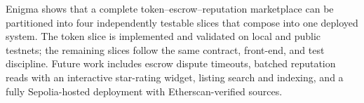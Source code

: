 Enigma shows that a complete token--escrow--reputation marketplace can be partitioned into four independently testable slices that compose into one deployed system. The token slice is implemented and validated on local and public testnets; the remaining slices follow the same contract, front-end, and test discipline. Future work includes escrow dispute timeouts, batched reputation reads with an interactive star-rating widget, listing search and indexing, and a fully Sepolia-hosted deployment with Etherscan-verified sources.
